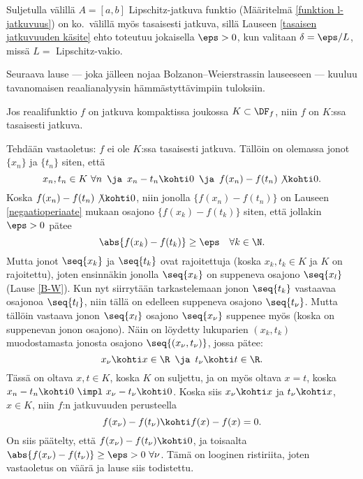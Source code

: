\begin{Exa} Suljetulla välillä $A=[a,b]$ Lipschitz-jatkuva funktio (Määritelmä
\ref{funktion l-jatkuvuus}) on ko.\ välillä myös tasaisesti jatkuva, sillä Lauseen
\ref{tasaisen jatkuvuuden käsite} ehto toteutuu jokaisella $\eps>0$, kun valitaan
$\delta=\eps/L$, missä $L=$ Lipschitz-vakio. \loppu
\end{Exa}
Seuraava lause --- joka jälleen nojaa Bolzanon--Weierstrassin lauseeseen --- kuuluu
tavanomaisen reaalianalyysin hämmästyttävimpiin tuloksiin.
\begin{*Lause} \label{kompaktissa joukossa jatkuva on tasaisesti jatkuva}
Jos reaalifunktio $f$ on jatkuva kompaktissa joukossa $K\subset\DF_f$, niin $f$ on
$K$:ssa tasaisesti jatkuva.
\end{*Lause}
\tod Tehdään vastaoletus: $f$ ei ole $K$:ssa tasaisesti jatkuva. Tällöin on olemassa jonot 
$\{x_n\}$ ja $\{t_n\}$ siten, että
\[
x_n,t_n\in K\ \forall n\,\ \ja\,\ x_n-t_n\kohti 0\,\ \ja\,\ f(x_n)-f(t_n) \not\kohti 0.
\]
Koska $f(x_n)-f(t_n) \not\kohti 0$, niin jonolla $\{f(x_n)-f(t_n)\}$ on Lauseen 
\ref{negaatioperiaate} mukaan osajono $\{f(x_k)-f(t_k)\}$ siten, että jollakin $\eps>0$ pätee
\[
\abs{f(x_k)-f(t_k)} \ge \eps \quad\forall k\in\N.
\]
Mutta jonot $\seq{x_k}$ ja $\seq{t_k}$ ovat rajoitettuja (koska $x_k,t_k \in K$ ja $K$ on
rajoitettu), joten ensinnäkin jonolla $\seq{x_k}$ on suppeneva osajono $\seq{x_l}$
(Lause \ref{B-W}). Kun nyt siirrytään tarkastelemaan jonon $\seq{t_k}$ vastaavaa osajonoa
$\seq{t_l}$, niin tällä on edelleen suppeneva osajono $\seq{t_\nu}$. Mutta tällöin
vastaava jonon $\seq{x_l}$ osajono $\seq{x_\nu}$ suppenee myös (koska on suppenevan jonon
osajono). Näin on löydetty lukuparien $(x_k,t_k)$ muodostamasta jonosta osajono
$\seq{(x_\nu,t_\nu)}$, jossa pätee:  
\[
x_\nu \kohti x\in \R\,\ \ja\,\ t_\nu \kohti t\in\R.
\]
Tässä on oltava $x,t \in K$, koska $K$ on suljettu, ja on myös oltava $x=t$, koska 
$x_n-t_n \kohti 0\ \impl\ x_\nu-t_\nu \kohti 0$. Koska siis $x_\nu \kohti x$ ja 
$t_\nu \kohti x$, $x \in K$, niin $f$:n jatkuvuuden perusteella
\[
f(x_\nu)-f(t_\nu) \kohti f(x)-f(x) = 0.
\]
On siis päätelty, että $f(x_\nu)-f(t_\nu) \kohti 0$, ja toisaalta 
$\abs{f(x_\nu)-f(t_\nu)}\ge\eps>0\ \forall \nu$. Tämä on  looginen ristiriita, joten
vastaoletus on väärä ja lause siis todistettu. \loppu

